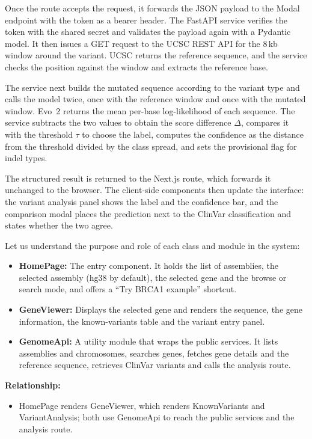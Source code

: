 Once the route accepts the request, it forwards the JSON payload to the Modal endpoint with the token as a bearer header. The FastAPI service verifies the token with the shared secret and validates the payload again with a Pydantic model. It then issues a GET request to the UCSC REST API for the 8\,kb window around the variant. UCSC returns the reference sequence, and the service checks the position against the window and extracts the reference base.

\par\noindent The service next builds the mutated sequence according to the variant type and calls the model twice, once with the reference window and once with the mutated window. Evo~2 returns the mean per-base log-likelihood of each sequence. The service subtracts the two values to obtain the score difference $\Delta$, compares it with the threshold $\tau$ to choose the label, computes the confidence as the distance from the threshold divided by the class spread, and sets the provisional flag for indel types.

The structured result is returned to the Next.js route, which forwards it unchanged to the browser. The client-side components then update the interface: the variant analysis panel shows the label and the confidence bar, and the comparison modal places the prediction next to the ClinVar classification and states whether the two agree.

\vspace{-2pt}
\begin{figure}\centering\setlength{\diagH}{0.82\portw}\diagClass\par\vspace{-2pt}\label{fig:4.5}\end{figure}

Let us understand the purpose and role of each class and module in the system:

\begin{itemize}
\item \textbf{HomePage:} The entry component. It holds the list of assemblies, the selected assembly (hg38 by default), the selected gene and the browse or search mode, and offers a ``Try BRCA1 example'' shortcut.
\item \textbf{GeneViewer:} Displays the selected gene and renders the sequence, the gene information, the known-variants table and the variant entry panel.
\item \textbf{GenomeApi:} A utility module that wraps the public services. It lists assemblies and chromosomes, searches genes, fetches gene details and the reference sequence, retrieves ClinVar variants and calls the analysis route.
\end{itemize}
\textbf{Relationship:}
\begin{itemize}
\item HomePage renders GeneViewer, which renders KnownVariants and VariantAnalysis; both use GenomeApi to reach the public services and the analysis route.
\end{itemize}

